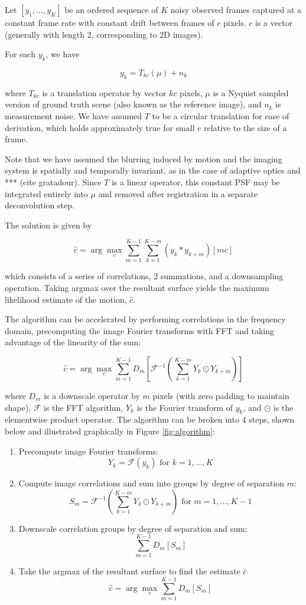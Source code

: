 \documentclass{article}
\begin{document}
Let $[y_1, ..., y_K]$ be an ordered sequence of $K$ noisy observed frames captured at a constant frame rate with constant drift between frames of $c$ pixels. $c$ is a vector (generally with length 2, corresponding to 2D images).

For each $y_k$, we have

$$y_k = T_{kc}(\mu) + n_k$$

where $T_{kc}$ is a translation operator by vector $kc$ pixels, $\mu$ is a Nyquist sampled version of ground truth scene (also known as the reference image), and $n_k$ is measurement noise.  We have assumed $T$ to be a circular translation for ease of derivation, which holds approximately true for small $c$ relative to the size of a frame.

Note that we have assumed the blurring induced by motion and the imaging system is spatially and temporally invariant, as in the case of adaptive optics and *** (cite gratadour).  Since $T$ is a linear operator, this constant PSF may be integrated entirely into $\mu$ and removed after registration in a separate deconvolution step.

The solution is given by

$$
\hat{c} = \arg \max_c \sum_{m=1}^{K-1}\sum_{k=1}^{K-m} (y_k \ast y_{k+m})[mc]
$$

which consists of a series of correlations, 2 summations, and a downsampling operation.  Taking argmax over the resultant surface yields the maximum likelihood estimate of the motion, $\hat{c}$.

The algorithm can be accelerated by performing correlations in the frequency domain, precomputing the image Fourier transforms with FFT and taking advantage of the linearity of the sum:

\begin{equation}
\hat{c} = \arg \max_c \sum_{m=1}^{K-1} D_m \left[
\mathcal{F}^{-1} \left( \sum_{k=1}^{K-m} Y_k \odot Y_{k+m} \right)
\right]
\label{eq:algorithm}
\end{equation}

where $D_m$ is a downscale operator by $m$ pixels (with zero padding to maintain shape), $\mathcal{F}$ is the FFT algorithm, $Y_k$ is the Fourier transform of $y_k$, and $\odot$ is the elementwise product operator.
The algorithm can be broken into 4 steps, shown below and illustrated graphically in Figure \ref{fig:algorithm}:

\begin{enumerate}
  \item Precompute image Fourier transforms:
    $$Y_k=\mathcal{F}(y_k) \text{ for } k=1,...,K$$
  \item Compute image correlations and sum into groups by degree of separation $m$:
    $$S_m = \mathcal{F}^{-1} \left( \sum_{k=1}^{K-m} Y_k \odot Y_{k+m} \right) \text{ for } m=1, ..., K-1$$
  \item Downscale correlation groups by degree of separation and sum:
    $$\sum_{m=1}^{K-1} D_m \left[ S_m \right]$$
  \item Take the argmax of the resultant surface to find the estimate $\hat{c}$
    $$\hat{c} = \arg \max_c \sum_{m=1}^{K-1} D_m \left[ S_m \right]$$
\end{enumerate}
\end{document}
